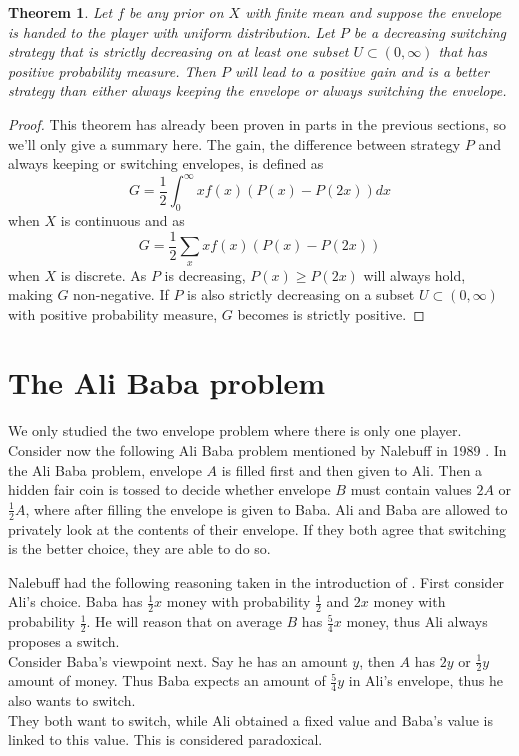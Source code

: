 \documentclass[a4paper]{report}
\theoremstyle{plain}
\newtheorem{theorem}{Theorem}[section]
\theoremstyle{definition}
\theoremstyle{remark}
\numberwithin{equation}{chapter}
\DeclareMathOperator{\1}{\mathbbm{1}}
\begin{document}
\begin{theorem}\label{thm:switchall}
Let $f$ be any prior on $X$ with finite mean and suppose the envelope is handed to the player with uniform distribution. Let $P$ be a decreasing switching strategy that is strictly decreasing on at least one subset $U\subset(0,\infty)$ that has positive probability measure. Then $P$ will lead to a positive gain and is a better strategy than either always keeping the envelope or always switching the envelope.
\end{theorem}
\begin{proof}
This theorem has already been proven in parts in the previous sections, so we'll only give a summary here. The gain, the difference between strategy $P$ and always keeping or switching envelopes, is defined as
\begin{equation}
G=\frac{1}{2}\int_0^\infty xf(x)(P(x)-P(2x))dx
\end{equation}
when $X$ is continuous and as
\begin{equation}
G=\frac{1}{2}\sum_xxf(x)(P(x)-P(2x))
\end{equation}
when $X$ is discrete. As $P$ is decreasing, $P(x)\geq P(2x)$ will always hold, making $G$ non-negative. If $P$ is also strictly decreasing on a subset $U\subset(0,\infty)$ with positive probability measure, $G$ becomes is strictly positive.
\end{proof}

\section{The Ali Baba problem}\label{sec:EnvelopeAli}
We only studied the two envelope problem where there is only one player. Consider now the following Ali Baba problem mentioned by Nalebuff in 1989 \cite{Nalebuff89}. In the Ali Baba problem, envelope $A$ is filled first and then given to Ali. Then a hidden fair coin is tossed to decide whether envelope $B$ must contain values $2A$ or $\frac{1}{2}A$, where after filling the envelope is given to Baba. Ali and Baba are allowed to privately look at the contents of their envelope. If they both agree that switching is the better choice, they are able to do so.

Nalebuff had the following reasoning taken in the introduction of \cite{Nalebuff89}. First consider Ali's choice. Baba has $\frac{1}{2}x$ money with probability $\frac{1}{2}$ and $2x$ money with probability $\frac{1}{2}$. He will reason that on average $B$ has $\frac{5}{4}x$ money, thus Ali always proposes a switch.\\
Consider Baba's viewpoint next. Say he has an amount $y$, then $A$ has $2y$ or $\frac{1}{2}y$ amount of money. Thus Baba expects an amount of $\frac{5}{4}y$ in Ali's envelope, thus he also wants to switch.\\
They both want to switch, while Ali obtained a fixed value and Baba's value is linked to this value. This is considered paradoxical.
\end{document}
